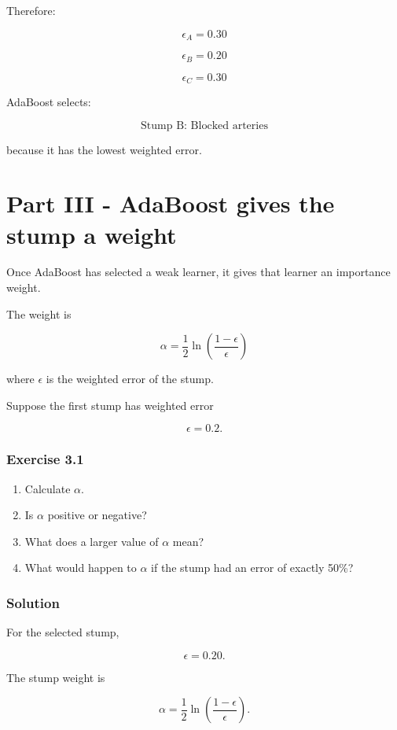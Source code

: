 \documentclass[10pt]{article}
\begin{document}
Therefore:

\[
{\epsilon_A=0.30}
\]

\[
{\epsilon_B=0.20}
\]

\[
{\epsilon_C=0.30}
\]

AdaBoost selects:

\[
{\text{Stump B: Blocked arteries}}
\]

because it has the lowest weighted error.

\par\endgroup

\clearpage
\section*{Part III - AdaBoost gives the stump a weight}
Once AdaBoost has selected a weak learner, it gives that learner an importance weight.

The weight is

\[
{
\alpha
=
\frac{1}{2}
\ln
\left(
\frac{1-\epsilon}{\epsilon}
\right)
}
\]

where $\epsilon$ is the weighted error of the stump.

Suppose the first stump has weighted error

\[
\epsilon=0.2.
\]

\subsubsection*{Exercise 3.1}
\begin{enumerate}
\item
Calculate $\alpha$.

\item
Is $\alpha$ positive or negative?

\item
What does a larger value of $\alpha$ mean?

\item
What would happen to $\alpha$ if the stump had an error of exactly 50\%?

\end{enumerate}
\begingroup\color{red}

\subsubsection*{Solution}
For the selected stump,

\[
\epsilon=0.20.
\]

The stump weight is

\[
\alpha=
\frac12
\ln\left(\frac{1-\epsilon}{\epsilon}\right).
\]
\end{document}
